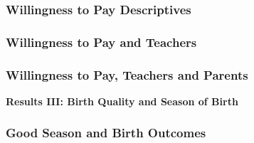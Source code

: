 \documentclass[10pt,letterpaper,subeqn]{beamer}
\begin{document}
\begin{frame}
  \frametitle{Willingness to Pay Descriptives}
    
\end{frame}

\begin{frame}
  \frametitle{Willingness to Pay and Teachers}
    
\end{frame}

\begin{frame}
  \frametitle{Willingness to Pay, Teachers and Parents}
    
\end{frame}


\begin{frame}
  \begin{center}
    \textbf{Results III: Birth Quality and Season of Birth}
  \end{center}
\end{frame}


\begin{frame}
\frametitle{Good Season and Birth Outcomes}
    
\end{frame}






\end{document}
